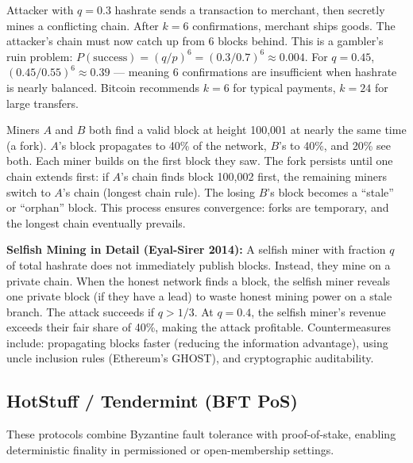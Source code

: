 \begin{example}
Attacker with $q = 0.3$ hashrate sends a transaction to merchant, then secretly mines a conflicting chain. After $k = 6$ confirmations, merchant ships goods. The attacker's chain must now catch up from 6 blocks behind. This is a gambler's ruin problem: $P(\text{success}) = (q/p)^6 = (0.3/0.7)^6 \approx 0.004$. For $q = 0.45$, $(0.45/0.55)^6 \approx 0.39$ — meaning 6 confirmations are insufficient when hashrate is nearly balanced. Bitcoin recommends $k = 6$ for typical payments, $k = 24$ for large transfers.
\end{example}

\begin{example}
Miners $A$ and $B$ both find a valid block at height 100,001 at nearly the same time (a fork). $A$'s block propagates to 40\% of the network, $B$'s to 40\%, and 20\% see both. Each miner builds on the first block they saw. The fork persists until one chain extends first: if $A$'s chain finds block 100,002 first, the remaining miners switch to $A$'s chain (longest chain rule). The losing $B$'s block becomes a ``stale'' or ``orphan'' block. This process ensures convergence: forks are temporary, and the longest chain eventually prevails.
\end{example}

\textbf{Selfish Mining in Detail (Eyal-Sirer 2014):}
A selfish miner with fraction $q$ of total hashrate does not immediately publish blocks. Instead, they mine on a private chain. When the honest network finds a block, the selfish miner reveals one private block (if they have a lead) to waste honest mining power on a stale branch. The attack succeeds if $q > 1/3$. At $q = 0.4$, the selfish miner's revenue exceeds their fair share of 40\%, making the attack profitable. Countermeasures include: propagating blocks faster (reducing the information advantage), using uncle inclusion rules (Ethereum's GHOST), and cryptographic auditability.

\subsection{HotStuff / Tendermint (BFT PoS)}
\label{sec:consensus:hotstuff}

These protocols combine Byzantine fault tolerance with proof-of-stake, enabling deterministic finality in permissioned or open-membership settings.

